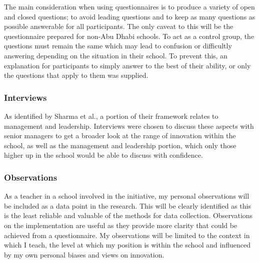 The main consideration when using questionnaires is to produce a variety of open and closed questions; to avoid leading questions and to keep as many questions as possible answerable for all participants. The only caveat to this will be the questionnaire prepared for non-Abu Dhabi schools. To act as a control group, the questions must remain the same which may lead to confusion or difficultly answering depending on the situation in their school. To prevent this, an explanation for participants to simply answer to the best of their ability, or only the questions that apply to them was supplied.

\subsubsection{Interviews}

As identified by Sharma et al., a portion of their framework relates to management and leadership. Interviews were chosen to discuss these aspects with senior managers to get a broader look at the range of innovation within the school, as well as the management and leadership portion, which only those higher up in the school would be able to discuss with confidence.

\subsubsection{Observations}

As a teacher in a school involved in the initiative, my personal observations will be included as a data point in the research. This will be clearly identified as this is the least reliable and valuable of the methods for data collection. Observations on the implementation are useful as they provide more clarity that could be achieved from a questionnaire. My observations will be limited to the context in which I teach, the level at which my position is within the school and influenced by my own personal biases and views on innovation. 

